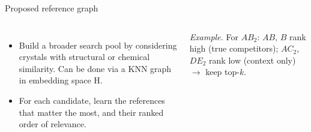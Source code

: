 \documentclass[10pt,aspectratio=169]{beamer}
\begin{document}
\begin{frame}{Proposed reference graph}
\begin{columns}[c]
\centering
{}
{}
\begin{itemize}\setlength\itemsep{3mm}
\item Build a broader search pool by considering crystals with structural or chemical similarity. Can be done via a KNN graph in embedding space H.
\item For each candidate, learn the references that matter the most, and their ranked order of relevance.
\end{itemize}
\vspace{2mm}
{\footnotesize\textit{Example.} For $AB_2$: $AB$, $B$ rank high (true competitors); $AC_2$, $DE_2$ rank low (context only) $\rightarrow$ keep top-$k$.}
\end{columns}
\end{frame}

\end{document}
